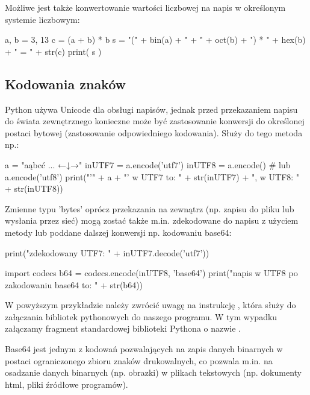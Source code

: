 Możliwe jest także konwertowanie wartości liczbowej na napis w określonym systemie liczbowym:

\begin{CodeFrame*}[python]{}
a, b = 3, 13
c = (a + b) * b
s = "(" + bin(a) + " + " + oct(b) + ") * " + hex(b) + " = " + str(c)
print( s )
\end{CodeFrame*} 

\subsection{Kodowania znaków}

Python używa Unicode dla obsługi napisów, jednak przed przekazaniem napisu do świata zewnętrznego konieczne może być zastosowanie konwersji do określonej postaci bytowej (zastosowanie odpowiedniego kodowania).
Służy do tego metoda  np.:

\begin{CodeFrame*}[python]{}
a = "aąbcć ... ←↓→"
inUTF7 = a.encode('utf7')
inUTF8 =  a.encode() # lub a.encode('utf8')
print("'" + a + "' w UTF7 to: " + str(inUTF7) + ", w UTF8: " + str(inUTF8))
\end{CodeFrame*}

Zmienne typu 'bytes' oprócz przekazania na zewnątrz (np. zapisu do pliku lub wysłania przez sieć) mogą zostać także m.in. zdekodowane do napisu z użyciem metody  lub poddane dalszej konwersji np. kodowaniu base64:

\begin{CodeFrame*}[python]{}
print("zdekodowany UTF7: " + inUTF7.decode('utf7'))

import codecs
b64 = codecs.encode(inUTF8, 'base64')
print("napis w UTF8 po zakodowaniu base64 to: " + str(b64))
\end{CodeFrame*}

W powyższym przykładzie należy zwrócić uwagę na instrukcję , która służy do załączania bibliotek pythonowych do naszego programu.
W tym wypadku załączamy fragment standardowej biblioteki Pythona o nazwie .

Base64 jest jednym z kodowań pozwalających na zapis danych binarnych w postaci ograniczonego zbioru znaków drukowalnych,
co pozwala m.in. na osadzanie danych binarnych (np. obrazki) w plikach tekstowych (np. dokumenty html, pliki źródłowe programów).

